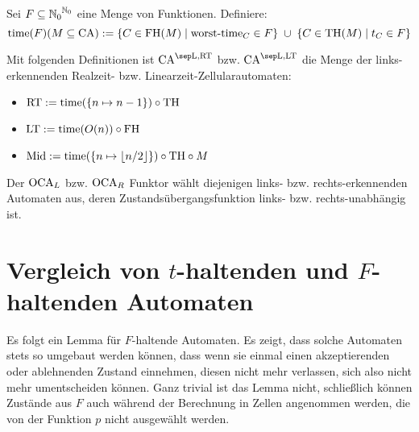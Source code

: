 \begin{definition}

    Sei $F \subseteq {\mathbb{N}_0}^{\mathbb{N}_0}$ eine Menge von Funktionen. Definiere:
    \[
        \mathrm{time}(F)(M \subseteq \textrm{CA}) := \{ { C \in \textrm{FH}(M) } \; | \; { \operatorname{worst-time}_C \in F } \} \; \cup \; \{ { C \in \textrm{TH}(M) } \; | \; { t_C \in F } \}
    \]
    
    Mit folgenden Definitionen ist $\CAM{\CALeft, \CART}$ \acs{bzw.} $\CAM{\CALeft, \CALT}$ die Menge der links-erkennenden Realzeit- \acs{bzw.} Linearzeit-Zellularautomaten:

    \begin{itemize}
        \item $\mathrm{\textrm{RT}} := \mathrm{time}(\{ {n \mapsto n - 1} \}) \circ \textrm{TH}$
        \item $\mathrm{\textrm{LT}} := \mathrm{time}(O(n)) \circ \textrm{FH}$
        \item $\mathrm{Mid} := \mathrm{time}(\{ {n \mapsto \lfloor n/2 \rfloor} \}) \circ \textrm{TH} \circ M $
    \end{itemize}   
\end{definition}


\begin{definition}
    Der $\operatorname{OCA}_L$ \acs{bzw.} $\operatorname{OCA}_R$ Funktor wählt diejenigen links- \acs{bzw.} rechts-erkennenden Automaten aus, deren Zustandsübergangsfunktion links- \acs{bzw.} rechts-unabhängig ist.
\end{definition}

\section{Vergleich von \texorpdfstring{$t$}{t}-haltenden und \texorpdfstring{$F$}{F}-haltenden Automaten}
\label{sec:Vergleich_t_haltend_F_haltend}

Es folgt ein Lemma für $F$-haltende Automaten. Es zeigt, dass solche Automaten stets so umgebaut werden können,
dass wenn sie einmal einen akzeptierenden oder ablehnenden Zustand einnehmen, diesen nicht mehr verlassen, sich also nicht mehr umentscheiden können.
Ganz trivial ist das Lemma nicht, schließlich können Zustände aus $F$ auch während der Berechnung in Zellen angenommen werden,
die von der Funktion $p$ nicht ausgewählt werden.

